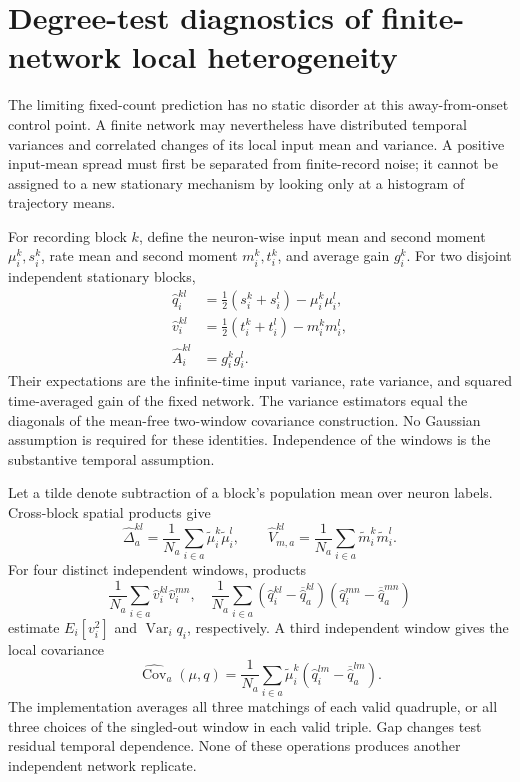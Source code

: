 \section{Degree-test diagnostics of finite-network local heterogeneity}
\label{sec:degree-local-diagnostics}

The limiting fixed-count prediction has no static disorder at this
away-from-onset control point. A finite network may nevertheless have
distributed temporal variances and correlated changes of its local input
mean and variance. A positive input-mean spread must first be separated from
finite-record noise; it cannot be assigned to a new stationary mechanism by
looking only at a histogram of trajectory means.

For recording block \(k\), define the neuron-wise input mean and second
moment \(\mu_i^k,s_i^k\), rate mean and second moment \(m_i^k,t_i^k\), and
average gain \(g_i^k\). For two disjoint independent stationary blocks,
\begin{align*}
 \widehat q_i^{kl}
 &=\tfrac12(s_i^k+s_i^l)-\mu_i^k\mu_i^l,\\
 \widehat v_i^{kl}
 &=\tfrac12(t_i^k+t_i^l)-m_i^k m_i^l,\\
 \widehat A_i^{kl}&=g_i^kg_i^l.
\end{align*}
Their expectations are the infinite-time input variance, rate variance, and
squared time-averaged gain of the fixed network. The variance estimators
equal the diagonals of the mean-free two-window covariance construction.
No Gaussian assumption is required for these identities. Independence of
the windows is the substantive temporal assumption.

Let a tilde denote subtraction of a block's population mean over neuron
labels. Cross-block spatial products give
\[
 \widehat\Delta_a^{kl}
 =\frac1{N_a}\sum_{i\in a}\widetilde\mu_i^k\widetilde\mu_i^l,\qquad
 \widehat V_{m,a}^{kl}
 =\frac1{N_a}\sum_{i\in a}\widetilde m_i^k\widetilde m_i^l.
\]
For four distinct independent windows, products
\[
 \frac1{N_a}\sum_{i\in a}\widehat v_i^{kl}\widehat v_i^{mn},
 \quad
 \frac1{N_a}\sum_{i\in a}
  (\widehat q_i^{kl}-\overline{\widehat q}_a^{kl})
  (\widehat q_i^{mn}-\overline{\widehat q}_a^{mn})
\]
estimate \(E_i[v_i^2]\) and \(\operatorname{Var}_i q_i\), respectively.
A third independent window gives the local covariance
\[
 \widehat{\operatorname{Cov}}_a(\mu,q)
 =\frac1{N_a}\sum_{i\in a}
  \widetilde\mu_i^k
  (\widehat q_i^{lm}-\overline{\widehat q}_a^{lm}).
\]
The implementation averages all three matchings of each valid quadruple,
or all three choices of the singled-out window in each valid triple.
Gap changes test residual temporal dependence. None of these operations
produces another independent network replicate.

